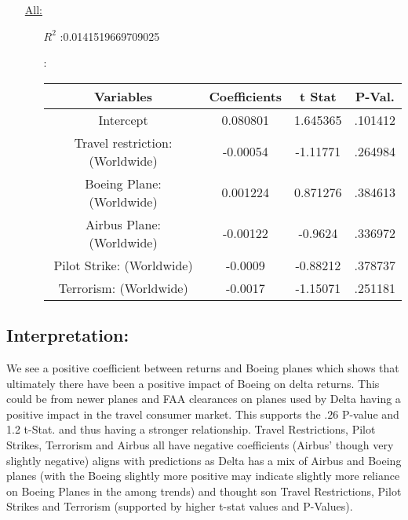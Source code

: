 \documentclass[12pt]{report}
\begin{document}
\begin{enumerate}
\begin{enumerate}
        \end{enumerate}
    \item[\underline{All:}]
        \begin{enumerate}
            \item[$R^2$]:0.0141519669709025
            \item[]:


                \begin{tabular}{|c|c|c|c|}
                    \toprule \hline
                    \textbf{Variables} & \textbf{Coefficients} & \textbf{t Stat} &\textbf{P-Val.}\\ \hline

                    Intercept & 0.080801 & 1.645365&.101412 \\ \hline
                    Travel restriction: (Worldwide) & -0.00054 & -1.11771 &.264984 \\ \hline
                    Boeing Plane: (Worldwide) & 0.001224 & 0.871276& .384613 \\ \hline
                    Airbus Plane: (Worldwide) & -0.00122 & -0.9624 &.336972 \\ \hline
                    Pilot Strike: (Worldwide) & -0.0009 & -0.88212 &.378737 \\ \hline
                    Terrorism: (Worldwide) & -0.0017 & -1.15071&.251181 \\ \hline
                    \bottomrule
                \end{tabular}





        \end{enumerate}
\end{enumerate}
\subsection*{Interpretation:}
We see a positive coefficient between returns and Boeing planes which shows that ultimately there have been a positive impact of Boeing on delta returns.
This could be from newer planes and FAA clearances on planes used by Delta having a positive impact in the travel consumer market.
This supports the $.26$ P-value and 1.2 t-Stat. and thus having a stronger relationship.
Travel Restrictions, Pilot Strikes, Terrorism and Airbus all have negative coefficients (Airbus' though very slightly negative)
aligns with predictions as Delta has a mix of Airbus and Boeing planes (with the Boeing slightly more positive may indicate slightly more reliance on Boeing Planes in the among trends)
and thought son Travel Restrictions, Pilot Strikes and Terrorism (supported by higher t-stat values and P-Values).
\newpage
\end{document}
